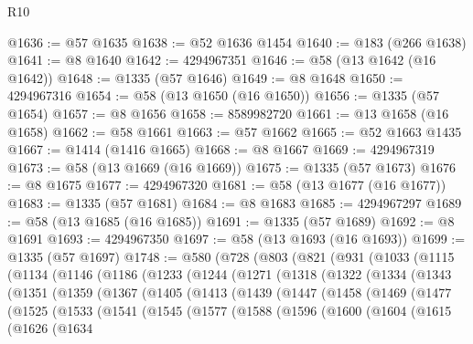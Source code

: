 \begin{lexlean}{R10}
\begin{coremodule}
@1636 := @57 @1635
@1638 := @52 @1636 @1454
@1640 := @183 (@266 @1638)
@1641 := @8 @1640
@1642 := 4294967351
@1646 := @58 (@13 @1642 (@16 @1642))
@1648 := @1335 (@57 @1646)
@1649 := @8 @1648
@1650 := 4294967316
@1654 := @58 (@13 @1650 (@16 @1650))
@1656 := @1335 (@57 @1654)
@1657 := @8 @1656
@1658 := 8589982720
@1661 := @13 @1658 (@16 @1658)
@1662 := @58 @1661
@1663 := @57 @1662
@1665 := @52 @1663 @1435
@1667 := @1414 (@1416 @1665)
@1668 := @8 @1667
@1669 := 4294967319
@1673 := @58 (@13 @1669 (@16 @1669))
@1675 := @1335 (@57 @1673)
@1676 := @8 @1675
@1677 := 4294967320
@1681 := @58 (@13 @1677 (@16 @1677))
@1683 := @1335 (@57 @1681)
@1684 := @8 @1683
@1685 := 4294967297
@1689 := @58 (@13 @1685 (@16 @1685))
@1691 := @1335 (@57 @1689)
@1692 := @8 @1691
@1693 := 4294967350
@1697 := @58 (@13 @1693 (@16 @1693))
@1699 := @1335 (@57 @1697)
@1748 := @580
    (@728
      (@803
        (@821
          (@931
            (@1033
              (@1115
                (@1134
                  (@1146
                    (@1186
                      (@1233
                        (@1244
                          (@1271
                            (@1318
                              (@1322
                                (@1334
                                  (@1343
                                    (@1351
                                      (@1359
                                        (@1367
                                          (@1405
                                            (@1413
                                              (@1439
                                                (@1447
                                                  (@1458
                                                    (@1469
                                                      (@1477
                                                        (@1525
                                                          (@1533
                                                            (@1541
                                                              (@1545
                                                                (@1577
                                                                  (@1588
                                                                    (@1596
                                                                      (@1600
                                                                        (@1604
                                                                          (@1615
                                                                            (@1626
                                                                              (@1634

\end{coremodule}
\end{lexlean}
